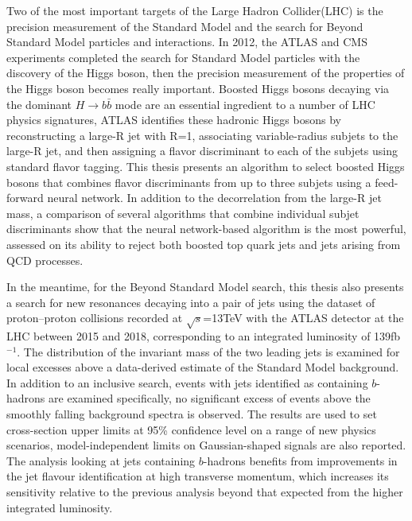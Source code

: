\begin{abstract*}

Two of the most important targets of the Large Hadron Collider(LHC) is the precision measurement of the Standard Model and 
the search for Beyond Standard Model particles and interactions.
In 2012, the ATLAS and CMS experiments completed the search for Standard Model particles with the discovery of the Higgs boson,
then the precision measurement of the properties of the Higgs boson becomes really important.
Boosted Higgs bosons decaying via the dominant $H\to b\bar{b}$ mode are an essential ingredient to a number of LHC physics signatures,
ATLAS identifies these hadronic Higgs bosons by reconstructing a large-R jet with R=1, associating variable-radius subjets to the large-R jet,
and then assigning a flavor discriminant to each of the subjets using standard flavor tagging.
This thesis presents an algorithm to select boosted Higgs bosons that combines flavor discriminants from up to three subjets using a feed-forward neural network.
In addition to the decorrelation from the large-R jet mass,
a comparison of several algorithms that combine individual subjet discriminants show that the neural network-based algorithm is the most powerful, 
assessed on its ability to reject both boosted top quark jets and jets arising from QCD processes. 

In the meantime, for the Beyond Standard Model search,
this thesis also presents a search for new resonances decaying into a pair of jets 
using the dataset of proton--proton collisions recorded at $\sqrt{s}$=13TeV with the ATLAS detector at the LHC between 2015 and 2018, corresponding to an integrated luminosity of 139fb$^{-1}$.
The distribution of the invariant mass of the two leading jets is examined for local excesses above a data-derived estimate of the Standard Model background.
In addition to an inclusive search, events with jets identified as containing $b$-hadrons are examined specifically,
no significant excess of events above the smoothly falling background spectra is observed.
The results are used to set cross-section upper limits at 95\% confidence level on a range of new physics scenarios, model-independent limits on Gaussian-shaped signals are also reported.
The analysis looking at jets containing $b$-hadrons benefits from improvements in the jet flavour identification at high transverse momentum, 
which increases its sensitivity relative to the previous analysis beyond that expected from the higher integrated luminosity.




\end{abstract*}
